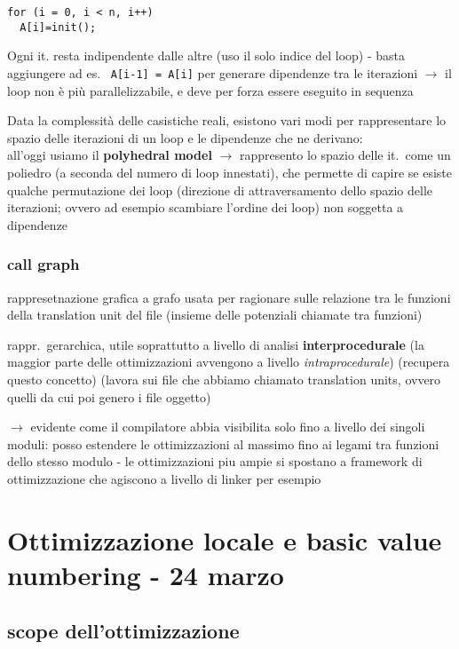 \begin{lstlisting}
for (i = 0, i < n, i++)
  A[i]=init();
\end{lstlisting}


Ogni it. resta indipendente dalle altre (uso il solo indice del loop) - basta aggiungere ad es.~ \lstinline|A[i-1] = A[i]| per generare dipendenze tra le iterazioni $\rightarrow$ il loop non \`e pi\`u parallelizzabile, e deve per forza essere eseguito in sequenza

Data la complessit\`a delle casistiche reali,  esistono vari modi per rappresentare lo spazio delle iterazioni di un loop e le dipendenze che ne derivano:\\
all'oggi usiamo il \textbf{polyhedral model} $\rightarrow$ rappresento lo spazio delle it.~come un poliedro (a seconda del numero di loop innestati), che permette di capire se esiste qualche permutazione dei loop (direzione di attraversamento dello spazio delle iterazioni; ovvero ad esempio scambiare l'ordine dei loop) non soggetta a dipendenze

\subsubsection{call graph}

rappresetnazione grafica a grafo usata per ragionare sulle relazione tra le funzioni della translation unit del file (insieme delle potenziali chiamate tra funzioni)

rappr.~gerarchica, utile soprattutto a livello di analisi \textbf{interprocedurale} (la maggior parte delle ottimizzazioni avvengono a livello \textit{intraprocedurale}) (recupera questo concetto) (lavora sui file che abbiamo chiamato translation units, ovvero quelli da cui poi genero i file oggetto)

$\rightarrow$ evidente come il compilatore abbia visibilita solo fino a livello dei singoli moduli: posso estendere le ottimizzazioni al massimo fino ai legami tra funzioni dello stesso modulo - le ottimizzazioni piu ampie si spostano a framework di ottimizzazione che agiscono a livello di linker per esempio

\section{Ottimizzazione locale e basic value numbering - 24 marzo}

\subsection{scope dell'ottimizzazione}

